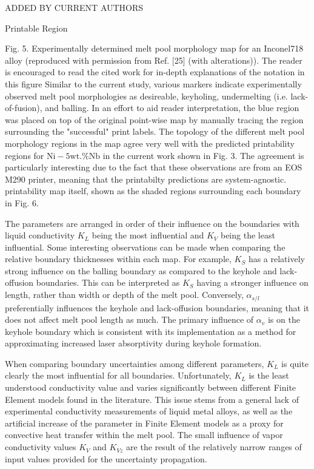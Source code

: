 \documentclass[10pt]{article}
\begin{document}
ADDED BY CURRENT AUTHORS

Printable Region

Fig. 5. Experimentally determined melt pool morphology map for an Inconel718 alloy (reproduced with permission from Ref. [25] (with alterations)). The reader is encouraged to read the cited work for in-depth explanations of the notation in this figure Similar to the current study, various markers indicate experimentally observed melt pool morphologies as desireable, keyholing, undermelting (i.e. lack-of-fusion), and balling. In an effort to aid reader interpretation, the blue region was placed on top of the original point-wise map by manually tracing the region surrounding the "successful" print labels. The topology of the different melt pool morphology regions in the map agree very well with the predicted printability regions for $\mathrm{Ni}-5 \mathrm{wt} . \% \mathrm{Nb}$ in the current work shown in Fig. 3. The agreement is particularly interesting due to the fact that these observations are from an EOS M290 printer, meaning that the printabilty predictions are system-agnostic.\\
printability map itself, shown as the shaded regions surrounding each boundary in Fig. 6.

The parameters are arranged in order of their influence on the boundaries with liquid conductivity $K_{L}$ being the most influential and $K_{V}$ being the least influential. Some interesting observations can be made when comparing the relative boundary thicknesses within each map. For example, $K_{S}$ has a relatively strong influence on the balling boundary as compared to the keyhole and lack-offusion boundaries. This can be interpreted as $K_{S}$ having a stronger influence on length, rather than width or depth of the melt pool. Conversely, $\alpha_{s / l}$ preferentially influences the keyhole and lack-offusion boundaries, meaning that it does not affect melt pool length as much. The primary influence of $\alpha_{v}$ is on the keyhole boundary which is consistent with its implementation as a method for approximating increased laser absorptivity during keyhole formation.

When comparing boundary uncertainties among different parameters, $K_{L}$ is quite clearly the most influential for all boundaries. Unfortunately, $K_{L}$ is the least understood conductivity value and varies significantly between different Finite Element models found in the literature. This issue stems from a general lack of experimental conductivity measurements of liquid metal alloys, as well as the artificial increase of the parameter in Finite Element models as a proxy for convective heat transfer within the melt pool. The small influence of vapor conductivity values $K_{V}$ and $K_{V z}$ are the result of the relatively narrow ranges of input values provided for the uncertainty propagation.
\end{document}
